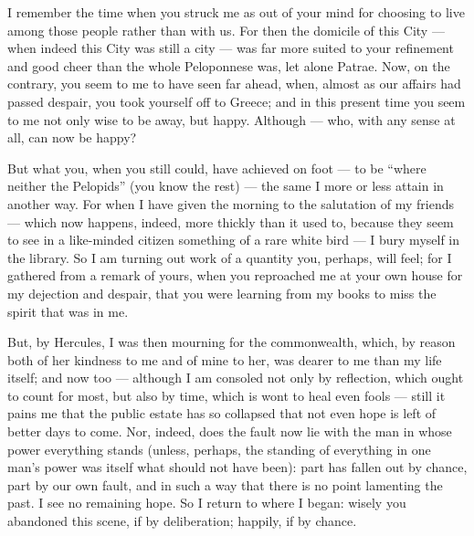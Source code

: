 

 I remember the time when you struck me as out of your mind for choosing to live among those people rather than with us. For then the domicile of this City --- when indeed this City was still a city --- was far more suited to your refinement and good cheer than the whole Peloponnese was, let alone Patrae. Now, on the contrary, you seem to me to have seen far ahead, when, almost as our affairs had passed despair, you took yourself off to Greece; and in this present time you seem to me not only wise to be away, but happy. Although --- who, with any sense at all, can now be happy?

 But what you, when you still could, have achieved on foot --- to be ``where neither the Pelopids'' (you know the rest) --- the same I more or less attain in another way. For when I have given the morning to the salutation of my friends --- which now happens, indeed, more thickly than it used to, because they seem to see in a like-minded citizen something of a rare white bird --- I bury myself in the library. So I am turning out work of a quantity you, perhaps, will feel; for I gathered from a remark of yours, when you reproached me at your own house for my dejection and despair, that you were learning from my books to miss the spirit that was in me.

 But, by Hercules, I was then mourning for the commonwealth, which, by reason both of her kindness to me and of mine to her, was dearer to me than my life itself; and now too --- although I am consoled not only by reflection, which ought to count for most, but also by time, which is wont to heal even fools --- still it pains me that the public estate has so collapsed that not even hope is left of better days to come. Nor, indeed, does the fault now lie with the man in whose power everything stands (unless, perhaps, the standing of everything in one man's power was itself what should not have been): part has fallen out by chance, part by our own fault, and in such a way that there is no point lamenting the past. I see no remaining hope. So I return to where I began: wisely you abandoned this scene, if by deliberation; happily, if by chance.
